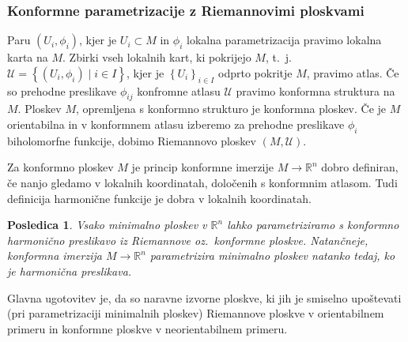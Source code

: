 \documentclass[8pt]{beamer}
\theoremstyle{definition}
\theoremstyle{remark}
\theoremstyle{plain}
\newtheorem{posledica}[definicija]{Posledica}
\numberwithin{equation}{section}  %
\begin{document}
\begin{frame}
    \frametitle{Konformne parametrizacije z Riemannovimi ploskvami}

    Paru $\left(U_i, \phi_i\right)$, kjer je $U_i \subset M$ in $\phi_i$ lokalna parametrizacija pravimo \textcolor{red1}{lokalna karta} na $M$. Zbirki vseh lokalnih kart, ki pokrijejo $M$, t.~j.~$\mathcal{U}=\left\{\left(U_i, \phi_i\right) \mid i \in I\right\}$, kjer je $\left\{U_i\right\}_{i \in I}$ odprto pokritje $M$, pravimo \textcolor{red1}{atlas}. Če so prehodne preslikave $\phi_{ij}$ konfromne atlasu $\mathcal{U}$ pravimo \textcolor{red1}{konformna struktura} na $M$. Ploskev $M$, opremljena s konformno strukturo je \textcolor{red1}{konformna ploskev}. Če je $M$ orientabilna in v konformnem atlasu izberemo za prehodne preslikave $\phi_i$ biholomorfne funkcije, dobimo \textcolor{red1}{Riemannovo ploskev} $(M, \mathcal{U})$. 
    
    \vspace{0.8em}

    Za konformno ploskev $M$ je princip konformne imerzije $M \rightarrow \mathbb{R}^n$ dobro definiran, če nanjo gledamo v lokalnih koordinatah, določenih s konformnim atlasom. Tudi definicija harmonične funkcije je dobra v lokalnih koordinatah.
    \begin{posledica}
        Vsako minimalno ploskev v $\mathbb{R}^n$ lahko parametriziramo s konformno harmonično preslikavo iz Riemannove oz.~konformne ploskve. Natančneje, konformna imerzija $M\rightarrow \mathbb{R}^n$ parametrizira minimalno ploskev natanko tedaj, ko je harmonična preslikava.
    \end{posledica}
    Glavna ugotovitev je, da so naravne izvorne ploskve, ki jih je smiselno upoštevati (pri parametrizaciji minimalnih ploskev) Riemannove ploskve v orientabilnem primeru in konformne ploskve v neorientabilnem primeru. 
    
\end{frame}
\end{document}
